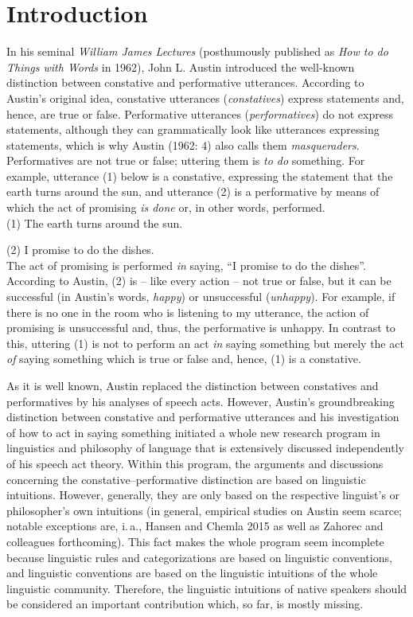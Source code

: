 \documentclass[egregdoesnotlikesansseriftitles,12pt]{scrartcl}
\begin{document}
\section{Introduction}\label{sec:introduction}
In his seminal \textit{William James Lectures} (posthumously published as \textit{How to do Things with Words} in 1962), John L. Austin introduced the well-known distinction between constative and performative utterances. According to Austin's original idea, constative utterances (\textit{constatives}) express statements and, hence, are true or false. Performative utterances (\textit{performatives}) do not express statements, although they can grammatically look like utterances expressing statements, which is why Austin (1962: 4) also calls them \textit{masqueraders}. Performatives are not true or false; uttering them is \textit{to do} something. For example, utterance (1) below is a constative, expressing the statement that the earth turns around the sun, and utterance (2) is a performative by means of which the act of promising \textit{is done} or, in other words, performed.\\

(1) The earth turns around the sun.\par
(2) I promise to do the dishes.\\

\noindent The act of promising is performed \textit{in} saying, ``I promise to do the dishes''. According to Austin, (2) is -- like every action -- not true or false, but it can be successful (in Austin's words, \textit{happy}) or unsuccessful (\textit{unhappy}). For example, if there is no one in the room who is listening to my utterance, the action of promising is unsuccessful and, thus, the performative is unhappy. In contrast to this, uttering (1) is not to perform an act \textit{in} saying something but merely the act \textit{of} saying something which is true or false and, hence, (1) is a constative.

As it is well known, Austin replaced the distinction between constatives and performatives by his analyses of speech acts. However, Austin's groundbreaking distinction between constative and performative utterances and his investigation of how to act in saying something initiated a whole new research program in linguistics and philosophy of language that is extensively discussed independently of his speech act theory. Within this program, the arguments and discussions concerning the constative--performative distinction are based on linguistic intuitions. However, generally, they are only based on the respective linguist's or philosopher's own intuitions (in general, empirical studies on Austin seem scarce; notable exceptions are, i.\,a., Hansen and Chemla 2015 as well as Zahorec and colleagues forthcoming). This fact makes the whole program seem incomplete because linguistic rules and categorizations are based on linguistic conventions, and linguistic conventions are based on the linguistic intuitions of the whole linguistic community. Therefore, the linguistic intuitions of native speakers should be considered an important contribution which, so far, is mostly missing.
\end{document}
